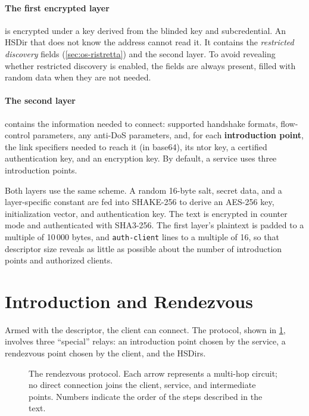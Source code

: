 \paragraph{The first encrypted layer} is encrypted under a key derived from the blinded key and subcredential. An HSDir that does not know the address cannot read it. It contains the \emph{restricted discovery} fields (\cref{sec:os-ristretta}) and the second layer. To avoid revealing whether restricted discovery is enabled, the fields are always present, filled with random data when they are not needed.

\paragraph{The second layer} contains the information needed to connect: supported handshake formats, flow-control parameters, any anti-DoS parameters, and, for each \textbf{introduction point}, the link specifiers needed to reach it (in base64), its ntor key, a certified authentication key, and an encryption key. By default, a service uses three introduction points.

Both layers use the same scheme. A random 16-byte salt, secret data, and a layer-specific constant are fed into SHAKE-256 to derive an AES-256 key, initialization vector, and authentication key. The text is encrypted in counter mode and authenticated with SHA3-256. The first layer's plaintext is padded to a multiple of 10\,000 bytes, and \texttt{auth-client} lines to a multiple of 16, so that descriptor size reveals as little as possible about the number of introduction points and authorized clients.

\section{Introduction and Rendezvous}\label{sec:os-rendezvous}

Armed with the descriptor, the client can connect. The protocol, shown in \cref{fig:os-rendezvous}, involves three \enquote{special} relays: an introduction point chosen by the service, a rendezvous point chosen by the client, and the HSDirs.

\begin{figure}[htbp]
\centering

\caption{The rendezvous protocol. Each arrow represents a multi-hop circuit; no direct connection joins the client, service, and intermediate points. Numbers indicate the order of the steps described in the text.}
\label{fig:os-rendezvous}
\end{figure}

